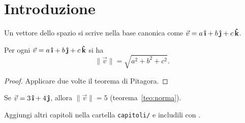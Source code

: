 \chapter{Introduzione}
\label{cap:introduzione}

\begin{definizione}
  Un vettore dello spazio si scrive nella base canonica come
  $\vec{v} = a\,\ihat + b\,\jhat + c\,\khat$.
\end{definizione}

\begin{teorema}
  \label{teo:norma}
  Per ogni $\vec{v} = a\,\ihat + b\,\jhat + c\,\khat$ si ha
  \[
    \lVert \vec{v} \rVert = \sqrt{a^2 + b^2 + c^2}.
  \]
\end{teorema}

\begin{proof}
  Applicare due volte il teorema di Pitagora.
\end{proof}

\begin{esempio}
  Se $\vec{v} = 3\,\ihat + 4\,\jhat$, allora $\lVert \vec{v} \rVert = 5$
  (teorema~\ref{teo:norma}).
\end{esempio}

\begin{osservazione}
  Aggiungi altri capitoli nella cartella \texttt{capitoli/} e includili con \verb||.
\end{osservazione}
